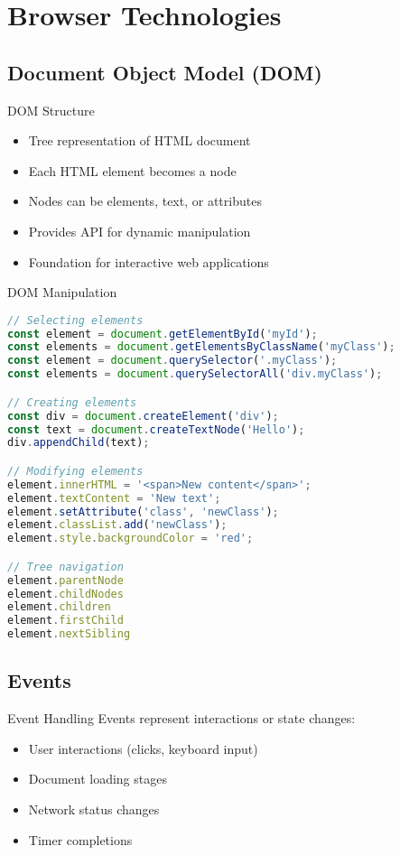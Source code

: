 \section{Browser Technologies}

\subsection{Document Object Model (DOM)}

\begin{concept}{DOM Structure}
    \begin{itemize}
        \item Tree representation of HTML document
        \item Each HTML element becomes a node
        \item Nodes can be elements, text, or attributes
        \item Provides API for dynamic manipulation
        \item Foundation for interactive web applications
    \end{itemize}
\end{concept}

\begin{KR}{DOM Manipulation}
\begin{lstlisting}[language=JavaScript, style=basesmol]
// Selecting elements
const element = document.getElementById('myId');
const elements = document.getElementsByClassName('myClass');
const element = document.querySelector('.myClass');
const elements = document.querySelectorAll('div.myClass');

// Creating elements
const div = document.createElement('div');
const text = document.createTextNode('Hello');
div.appendChild(text);

// Modifying elements
element.innerHTML = '<span>New content</span>';
element.textContent = 'New text';
element.setAttribute('class', 'newClass');
element.classList.add('newClass');
element.style.backgroundColor = 'red';

// Tree navigation
element.parentNode
element.childNodes
element.children
element.firstChild
element.nextSibling
\end{lstlisting}
\end{KR}

\subsection{Events}

\begin{definition}{Event Handling}
    Events represent interactions or state changes:
    \begin{itemize}
        \item User interactions (clicks, keyboard input)
        \item Document loading stages
        \item Network status changes
        \item Timer completions
    \end{itemize}
\end{definition}

